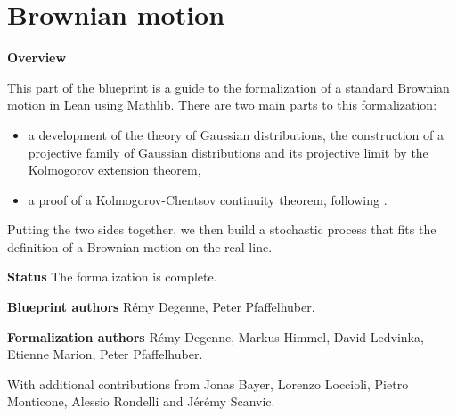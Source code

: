 %

\part{Brownian motion}

\textbf{Overview}

This part of the blueprint is a guide to the formalization of a standard Brownian motion in Lean using Mathlib. There are two main parts to this formalization:
\begin{itemize}
  \item a development of the theory of Gaussian distributions, the construction of a projective family of Gaussian distributions and its projective limit by the Kolmogorov extension theorem,
  \item a proof of a Kolmogorov-Chentsov continuity theorem, following \cite{kratschmer2023kolmogorov}.
\end{itemize}

Putting the two sides together, we then build a stochastic process that fits the definition of a Brownian motion on the real line.

\textbf{Status} The formalization is complete.

\textbf{Blueprint authors} Rémy Degenne, Peter Pfaffelhuber.

\textbf{Formalization authors} Rémy Degenne, Markus Himmel, David Ledvinka, Etienne Marion, Peter Pfaffelhuber.

With additional contributions from Jonas Bayer, Lorenzo Loccioli, Pietro Monticone, Alessio Rondelli and Jérémy Scanvic.








